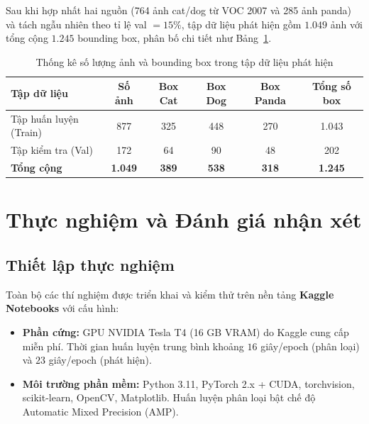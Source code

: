 \documentclass[fontsize=13pt,a4paper,oneside,DIV=calc,chapterprefix=true]{scrbook}
\begin{document}
Sau khi hợp nhất hai nguồn (764 ảnh cat/dog từ VOC 2007 và 285 ảnh panda) và tách ngẫu nhiên theo tỉ lệ val $=15\%$, tập dữ liệu phát hiện gồm $1.049$ ảnh với tổng cộng $1.245$ bounding box, phân bố chi tiết như Bảng~\ref{tab:det_data_stat}.

\begin{table}[H]
\centering
\caption{Thống kê số lượng ảnh và bounding box trong tập dữ liệu phát hiện}
\label{tab:det_data_stat}
\begin{tabular}{lccccc}
\toprule
\textbf{Tập dữ liệu} & \textbf{Số ảnh} & \textbf{Box Cat} & \textbf{Box Dog} & \textbf{Box Panda} & \textbf{Tổng số box}\\
\midrule
Tập huấn luyện (Train) & 877  & 325 & 448 & 270 & 1.043\\
Tập kiểm tra (Val)     & 172  & 64  & 90  & 48  & 202\\
\midrule
\textbf{Tổng cộng}     & \textbf{1.049} & \textbf{389} & \textbf{538} & \textbf{318} & \textbf{1.245}\\
\bottomrule
\end{tabular}
\end{table}

\chapter{Thực nghiệm và Đánh giá nhận xét}
\label{chap:exp}

\section{Thiết lập thực nghiệm}
Toàn bộ các thí nghiệm được triển khai và kiểm thử trên nền tảng \textbf{Kaggle Notebooks} với cấu hình:
\begin{itemize}[leftmargin=1.2cm]
    \item \textbf{Phần cứng:} GPU NVIDIA Tesla T4 (16 GB VRAM) do Kaggle cung cấp miễn phí. Thời gian huấn luyện trung bình khoảng $16$ giây/epoch (phân loại) và $23$ giây/epoch (phát hiện).
    \item \textbf{Môi trường phần mềm:} Python 3.11, PyTorch 2.x + CUDA, torchvision, scikit-learn, OpenCV, Matplotlib. Huấn luyện phân loại bật chế độ Automatic Mixed Precision (AMP).
\end{itemize}
\end{document}

